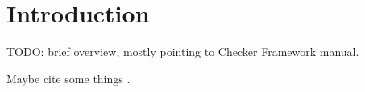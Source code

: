 \htmlhr
\chapter{Introduction\label{introduction}}

TODO: brief overview, mostly pointing to Checker Framework manual.

Maybe cite some things
\cite{PapiACPE2008}.
